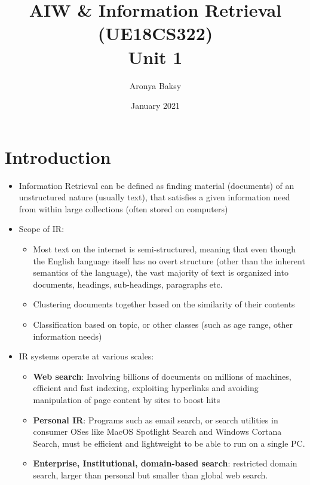 \documentclass{article}
\title{AIW \& Information Retrieval (UE18CS322)\\Unit 1}
\author{Aronya Baksy}
\date{January 2021}
\begin{document}
\maketitle

\section{Introduction}
\begin{itemize}
    \item Information Retrieval can be defined as finding material (documents) of an unstructured nature (usually text), that satisfies a given information need from within large collections (often stored on computers)
    
    \item Scope of IR:
    \begin{itemize}
        \item Most text on the internet is semi-structured, meaning that even though the English language itself has no overt structure (other than the inherent semantics of the language), the vast majority of text is organized into documents, headings, sub-headings, paragraphs etc.
        
        \item Clustering documents together based on the similarity of their contents
        
        \item Classification based on topic, or other classes (such as age range, other information needs)
    \end{itemize}
        
    \item IR systems operate at various scales:
    \begin{itemize}
        \item \textbf{Web search}: Involving billions of documents on millions of machines, efficient and fast indexing, exploiting hyperlinks and avoiding manipulation of page content by sites to boost hits
        
        \item \textbf{Personal IR}: Programs such as email search, or search utilities in consumer OSes like MacOS Spotlight Search and Windows Cortana Search, must be efficient and lightweight to be able to run on a single PC.
        
        \item \textbf{Enterprise, Institutional, domain-based search}: restricted domain search, larger than personal but smaller than global web search. 
    \end{itemize}
\end{itemize}
\end{document}
